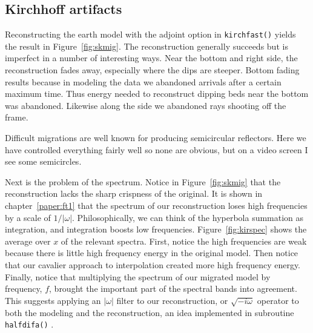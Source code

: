 \subsection{Kirchhoff artifacts}
Reconstructing the earth model with the adjoint option in \texttt{kirchfast()} 
yields the result in Figure~\ref{fig:skmig}. %
%
The reconstruction generally succeeds
but is imperfect in a number of interesting ways.
Near the bottom and right side, the reconstruction fades away,
especially where the dips are steeper.
Bottom fading results because in modeling the data
we abandoned arrivals after a certain maximum time.
Thus energy needed to reconstruct dipping beds near the bottom
was abandoned.
Likewise along the side we abandoned rays shooting off the frame.

\par
Difficult migrations are well known for producing semicircular reflectors.
Here we have controlled everything fairly well so none are obvious,
but on a video screen I see some semicircles.

\par
Next is the problem of the spectrum.
Notice in Figure~\ref{fig:skmig} that the reconstruction
lacks the sharp crispness of the original.
It is shown in chapter~\ref{paper:ft1}
that the spectrum of our reconstruction
loses high frequencies by a scale of $1/ | \omega |$.
Philosophically, we can think of the hyperbola summation
as integration, and integration boosts low frequencies.
Figure~\ref{fig:kirspec} shows the average over $x$
of the relevant spectra. %
First, notice the high frequencies are weak because
there is little high frequency energy in the original model.
Then notice that our cavalier approach to interpolation
created more high frequency energy.
Finally, notice that multiplying the spectrum of our
migrated model by frequency, $f$, brought the important
part of the spectral bands into agreement.
This suggests applying an $|\omega |$ filter to our reconstruction,
or $\sqrt{-i\omega}$ operator to both the modeling and the reconstruction,
an idea implemented in subroutine \texttt{halfdifa()} .

